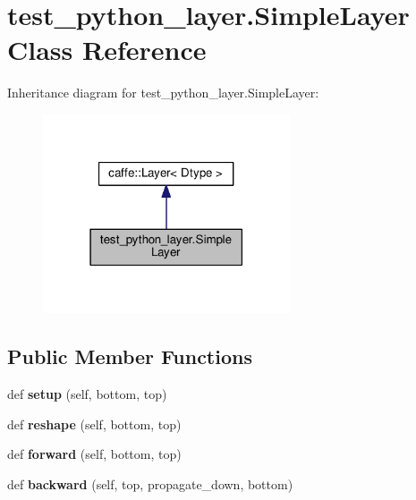 \hypertarget{classtest__python__layer_1_1_simple_layer}{}\section{test\+\_\+python\+\_\+layer.\+Simple\+Layer Class Reference}
\label{classtest__python__layer_1_1_simple_layer}


Inheritance diagram for test\+\_\+python\+\_\+layer.\+Simple\+Layer\+:
\nopagebreak
\begin{figure}[H]
\begin{center}
\leavevmode
\includegraphics[width=207pt]{classtest__python__layer_1_1_simple_layer__inherit__graph}
\end{center}
\end{figure}
\subsection*{Public Member Functions}
\begin{DoxyCompactItemize}
\item 
\mbox{\label{classtest__python__layer_1_1_simple_layer_a771c50bd471ec42b45321da08356e0c1}} 
def {\bfseries setup} (self, bottom, top)
\item 
\mbox{\label{classtest__python__layer_1_1_simple_layer_a7e92ab7e8cee5f59db80f0e043578ab7}} 
def {\bfseries reshape} (self, bottom, top)
\item 
\mbox{\label{classtest__python__layer_1_1_simple_layer_ac2ed0d5bf9321df89f8e5f952955b2a0}} 
def {\bfseries forward} (self, bottom, top)
\item 
\mbox{\label{classtest__python__layer_1_1_simple_layer_a89f9105c5080d5677bd59e935b99eac7}} 
def {\bfseries backward} (self, top, propagate\+\_\+down, bottom)
\end{DoxyCompactItemize}
